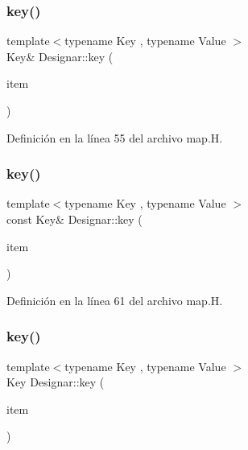 \mbox{\label{namespace_designar_ae26ed0e58d724f576ed6faecb606265b}} 
\subsubsection{\texorpdfstring{key()}{key()}\hspace{0.1cm}{\footnotesize\ttfamily [1/4]}}
{\footnotesize\ttfamily template$<$typename Key , typename Value $>$ \\
Key\& Designar\+::key (\begin{DoxyParamCaption}\item[{\hyperlink{namespace_designar_a7394b1b25278abf7211e77b91eb5204f}{Map\+Key}$<$ Key, Value $>$ \&}]{item }\end{DoxyParamCaption})}



Definición en la línea 55 del archivo map.\+H.

\mbox{\label{namespace_designar_aa8f8b118fb59d977b693196954abca76}} 
\subsubsection{\texorpdfstring{key()}{key()}\hspace{0.1cm}{\footnotesize\ttfamily [2/4]}}
{\footnotesize\ttfamily template$<$typename Key , typename Value $>$ \\
const Key\& Designar\+::key (\begin{DoxyParamCaption}\item[{const \hyperlink{namespace_designar_a7394b1b25278abf7211e77b91eb5204f}{Map\+Key}$<$ Key, Value $>$ \&}]{item }\end{DoxyParamCaption})}



Definición en la línea 61 del archivo map.\+H.

\mbox{\label{namespace_designar_a02dd98d2c308a1eb7f11ec2e5cb1b382}} 
\subsubsection{\texorpdfstring{key()}{key()}\hspace{0.1cm}{\footnotesize\ttfamily [3/4]}}
{\footnotesize\ttfamily template$<$typename Key , typename Value $>$ \\
Key Designar\+::key (\begin{DoxyParamCaption}\item[{\hyperlink{namespace_designar_a7394b1b25278abf7211e77b91eb5204f}{Map\+Key}$<$ Key, Value $>$ \&\&}]{item }\end{DoxyParamCaption})}



